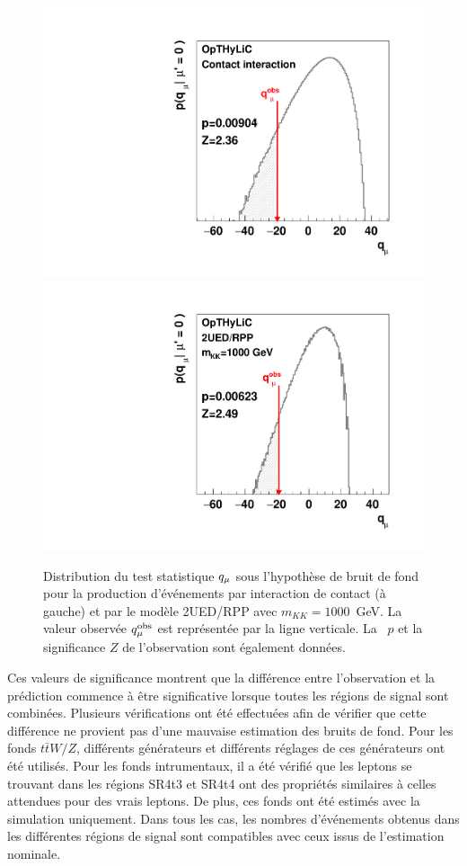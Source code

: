 \begin{figure}[!htb]
\begin{center}
\includegraphics[width=0.43\linewidth]{macros/significanceContactInteractionMcLimitNormal.pdf}
\includegraphics[width=0.43\linewidth]{macros/significance2UEDRPPMkk1000McLimitNormal.pdf}
\end{center}
\vspace*{-0.7cm}
\caption{Distribution du test statistique $q_\mu$ sous l'hypoth\`ese de bruit de fond pour la production d'\'ev\'enements \fourtop{} par interaction de contact (\`a gauche) et par le mod\`ele 2UED/RPP avec $m_{KK}=1000$~GeV. La valeur observ\'ee $q_\mu^{\text{obs}}$ est repr\'esent\'ee par la ligne verticale. La \pval~$p$ et la significance $Z$ de l'observation sont \'egalement donn\'ees.\label{fig:significanceCIRPPWithOTH}}
\end{figure}

Ces valeurs de significance montrent que la diff\'erence entre l'observation et la pr\'ediction commence \`a \^etre significative lorsque toutes les r\'egions de signal sont combin\'ees. 
Plusieurs v\'erifications ont \'et\'e effectu\'ees afin de v\'erifier que cette diff\'erence ne provient pas d'une mauvaise estimation des bruits de fond. 
Pour les fonds $t\bar{t}W/Z$, diff\'erents g\'en\'erateurs et diff\'erents r\'eglages de ces g\'en\'erateurs ont \'et\'e utilis\'es. 
Pour les fonds intrumentaux, il a \'et\'e v\'erifi\'e que les leptons se trouvant dans les r\'egions SR4t3 et SR4t4 ont des propri\'et\'es similaires \`a celles attendues pour des vrais leptons. 
De plus, ces fonds ont \'et\'e estim\'es avec la simulation uniquement. 
Dans tous les cas, les nombres d'\'ev\'enements obtenus dans les diff\'erentes r\'egions de signal sont compatibles avec ceux issus de l'estimation nominale.


